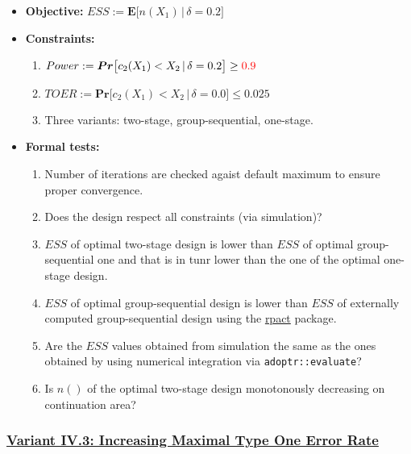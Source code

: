 \documentclass[]{book}
\providecommand{\tightlist}{%
  \setlength{\itemsep}{0pt}\setlength{\parskip}{0pt}}
\begin{document}
\begin{itemize}
\tightlist
\item
  \textbf{Objective:} \(ESS := \boldsymbol{E}\big[n(X_1)\,|\,\delta=0.2\big]\)
\item
  \textbf{Constraints:}

  \begin{enumerate}
  \def\labelenumi{\arabic{enumi}.}
  \tightlist
  \item
    \(Power := \boldsymbol{Pr}\big[c_2(X_1) < X_2\,|\,\delta=0.2\big] \geq \color{red}{0.9}\)
  \item
    \(TOER := \boldsymbol{Pr}\big[c_2(X_1) < X_2\,|\,\delta=0.0\big] \leq 0.025\)
  \item
    Three variants: two-stage, group-sequential, one-stage.
  \end{enumerate}
\item
  \textbf{Formal tests:}

  \begin{enumerate}
  \def\labelenumi{\arabic{enumi}.}
  \tightlist
  \item
    Number of iterations are checked agaist default maximum to ensure proper
    convergence.
  \item
    Does the design respect all constraints (via simulation)?
  \item
    \(ESS\) of optimal two-stage design is lower than \(ESS\) of optimal
    group-sequential one and that is in tunr lower than the one of the
    optimal one-stage design.
  \item
    \(ESS\) of optimal group-sequential design is lower than \(ESS\) of
    externally computed group-sequential design using the \href{https://rpact.org/}{rpact} package.
  \item
    Are the \(ESS\) values obtained from simulation the same as the ones
    obtained by using numerical integration via \texttt{adoptr::evaluate}?
  \item
    Is \(n()\) of the optimal two-stage design monotonously decreasing on
    continuation area?
  \end{enumerate}
\end{itemize}

\hypertarget{variant-iv.3-increasing-maximal-type-one-error-rate}{%
\subsubsection{\texorpdfstring{\protect\hyperlink{variantIV_3}{Variant IV.3: Increasing Maximal Type One Error Rate}}{Variant IV.3: Increasing Maximal Type One Error Rate}}\label{variant-iv.3-increasing-maximal-type-one-error-rate}}
\end{document}
